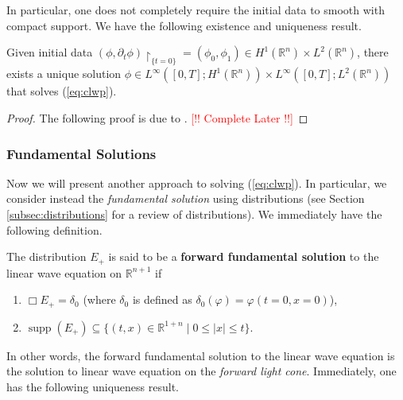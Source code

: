 \documentclass{article}
\begin{document}
In particular, one does not completely require the initial data to smooth with compact support. We have the following existence and uniqueness result. 

\begin{theorem}
	Given initial data $(\phi, \partial_{t}\phi)\upharpoonright_{\{t = 0\}} = (\phi_{0}, \phi_{1}) \in H^{1}(\mathbb{R}^{n}) \times L^{2}(\mathbb{R}^{n})$, there exists a unique solution $\phi \in L^{\infty}([0,T]; H^{1}(\mathbb{R}^{n})) \times L^{\infty}([0,T]; L^{2}(\mathbb{R}^{n}))$ that solves (\ref{eq:clwp}). 
\end{theorem}

\begin{proof}
	The following proof is due to \cite{Holzegel2021}. \textcolor{red}{[!! Complete Later !!]}
\end{proof}


\subsubsection{Fundamental Solutions}

Now we will present another approach to solving (\ref{eq:clwp}). In particular, we consider instead the \textit{fundamental solution} using distributions (see Section \ref{subsec:distributions} for a review of distributions). We immediately have the following definition. 

\begin{definition}
	The distribution $E_{+}$ is said to be a \textbf{forward fundamental solution} to the linear wave equation on $\mathbb{R}^{n + 1}$ if \vspace{-1.25em}
	\begin{enumerate}[itemsep =-2pt]
		\item $\Box E_{+} = \delta_{0}$ (where $\delta_{0}$ is defined as $\delta_{0}(\varphi) = \varphi(t = 0, x =0)$), 
		\item $\operatorname{supp}(E_{+}) \subseteq \{(t, x) \in \mathbb{R}^{1 + n} \mid 0 \leq |x| \leq t\}$. 
	\end{enumerate}
\end{definition} 
In other words, the forward fundamental solution to the linear wave equation is the solution to linear wave equation on the \textit{forward light cone}. Immediately, one has the following uniqueness result. 
\end{document}
